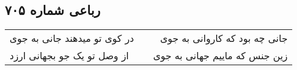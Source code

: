 \begin{center}
\section*{رباعی شماره ۷۰۵}
\label{sec:sh705}
\begin{longtable}{l p{0.5cm} r}
در کوی تو میدهند جانی به جوی
&&
جانی چه بود که کاروانی به جوی
\\
از وصل تو یک جو بجهانی ارزد
&&
زین جنس که ماییم جهانی به جوی
\\
\end{longtable}
\end{center}
